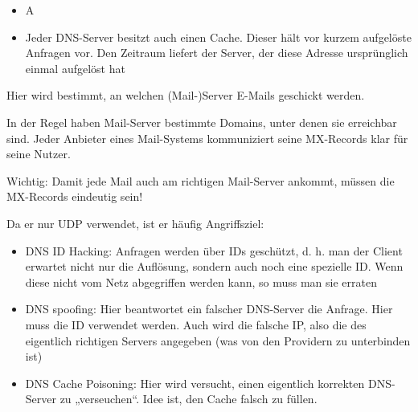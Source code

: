 \begin{itemize}
    \item \todo A
\end{itemize}

\begin{itemize}
    \item Jeder DNS-Server besitzt auch einen Cache.
    Dieser hält vor kurzem aufgelöste Anfragen vor.
    Den Zeitraum liefert der Server, der diese Adresse ursprünglich einmal aufgelöst hat
\end{itemize}


Hier wird bestimmt, an welchen (Mail-)Server E-Mails geschickt werden.

In der Regel haben Mail-Server bestimmte Domains, unter denen sie erreichbar sind.
Jeder Anbieter eines Mail-Systems kommuniziert seine MX-Records klar für seine Nutzer.

Wichtig: Damit jede Mail auch am richtigen Mail-Server ankommt, müssen die MX-Records eindeutig sein!

Da er nur UDP verwendet, ist er häufig Angriffsziel:
\begin{itemize}
    \item DNS ID Hacking: Anfragen werden über IDs geschützt, d. h. man der Client erwartet nicht nur die Auflösung, sondern auch noch eine spezielle ID. Wenn diese nicht vom Netz abgegriffen werden kann, so muss man sie erraten
    \item DNS spoofing: Hier beantwortet ein falscher DNS-Server die Anfrage.
    Hier muss die ID verwendet werden.
    Auch wird die falsche IP, also die des eigentlich richtigen Servers angegeben (was von den Providern zu unterbinden ist)
    \item DNS Cache Poisoning: Hier wird versucht, einen eigentlich korrekten DNS-Server zu „verseuchen“.
    Idee ist, den Cache falsch zu füllen.
\end{itemize}